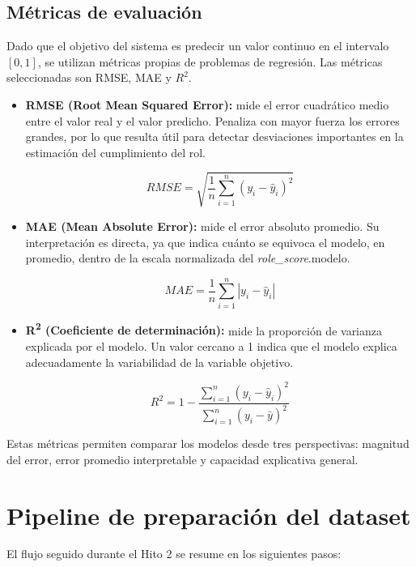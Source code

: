 \documentclass{ULBreport} %
\begin{document}
\subsection{Métricas de evaluación}

Dado que el objetivo del sistema es predecir un valor continuo en el intervalo $[0,1]$, se utilizan métricas propias de problemas de regresión. Las métricas seleccionadas son RMSE, MAE y $R^2$.

\begin{itemize}
    \item \textbf{RMSE (Root Mean Squared Error):} mide el error cuadrático medio entre el valor real y el valor predicho. Penaliza con mayor fuerza los errores grandes, por lo que resulta útil para detectar desviaciones importantes en la estimación del cumplimiento del rol.
    
    \[
    RMSE = \sqrt{\frac{1}{n}\sum_{i=1}^{n}(y_i - \hat{y}_i)^2}
    \]
    
    \item \textbf{MAE (Mean Absolute Error):} mide el error absoluto promedio. Su interpretación es directa, ya que indica cuánto se equivoca el modelo, en promedio, dentro de la escala normalizada del \textit{role\_score}.modelo.

    \[
    MAE = \frac{1}{n}\sum_{i=1}^{n}|y_i - \hat{y}_i|
    \]
    
    \item \textbf{R\textsuperscript{2} (Coeficiente de determinación):} mide la proporción de varianza explicada por el modelo. Un valor cercano a 1 indica que el modelo explica adecuadamente la variabilidad de la variable objetivo.

    \[
    R^2 = 1 - \frac{\sum_{i=1}^{n}(y_i - \hat{y}_i)^2}{\sum_{i=1}^{n}(y_i - \bar{y})^2}
    \]
    
\end{itemize}

Estas métricas permiten comparar los modelos desde tres perspectivas: magnitud del error, error promedio interpretable y capacidad explicativa general.

\section{Pipeline de preparación del dataset}

El flujo seguido durante el Hito 2 se resume en los siguientes pasos:
\end{document}
